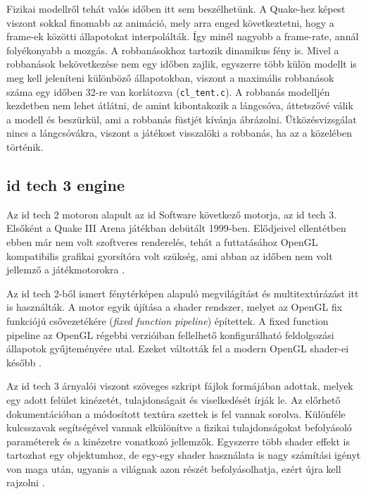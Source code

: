 Fizikai modellről tehát valós időben itt sem beszélhetünk. A Quake-hez képest viszont sokkal finomabb az animáció, mely arra enged következtetni, hogy a frame-ek közötti állapotokat interpolálták. Így minél nagyobb a frame-rate, annál folyékonyabb a mozgás. A robbanásokhoz tartozik dinamikus fény is. Mivel a robbanások bekövetkezése nem egy időben zajlik, egyszerre több külön modellt is meg kell jeleníteni különböző állapotokban, viszont a maximális robbanások száma egy időben 32-re van korlátozva (\texttt{cl\_tent.c}). A robbanás modelljén kezdetben nem lehet átlátni, de amint kibontakozik a lángcsóva, áttetszővé válik a modell és beszürkül, ami a robbanás füstjét kívánja ábrázolni. Ütközésvizsgálat nincs a lángcsóvákra, viszont a játékost visszalöki a robbanás, ha az a közelében történik. 

\subsection{id tech 3 engine}

Az id tech 2 motoron alapult az id Software következő motorja, az id tech 3. Elsőként a Quake III Arena játékban debütált 1999-ben. Elődjeivel ellentétben ebben már nem volt szoftveres renderelés, tehát a futtatásához OpenGL kompatibilis grafikai gyorsítóra volt szükség, ami abban az időben nem volt jellemző a játékmotorokra \cite{wikiQuake3}.


Az id tech 2-ből ismert fénytérképen alapuló megvilágítást és multitextúrázást itt is használták. A motor egyik újítása a shader rendszer, melyet az OpenGL fix funkciójú csővezetékére (\textit{fixed function pipeline}) építettek. A fixed function pipeline az OpenGL régebbi verzióiban fellelhető konfigurálható feldolgozási állapotok gyűjteményére utal. Ezeket váltották fel a modern OpenGL shader-ei később \cite{fsQuake3}.

Az id tech 3 árnyalói viszont szöveges szkript fájlok formájában adottak, melyek egy adott felület kinézetét, tulajdonságait és viselkedését írják le. Az előrhető dokumentációban a módosított textúra szettek is fel vannak sorolva. Különféle kulcsszavak segítségével vannak elkülönítve a fizikai tulajdonságokat befolyásoló paraméterek és a kinézetre vonatkozó jellemzők. Egyszerre több shader effekt is tartozhat egy objektumhoz, de egy-egy shader használata is nagy számítási igényt von maga után, ugyanis a világnak azon részét befolyásolhatja, ezért újra kell rajzolni \cite{quake3shaderManual}.

